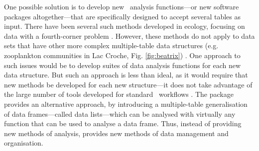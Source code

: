 \documentclass[a4paper]{report}
\numberwithin{exercise}{section}
\begin{document}
\begin{article}
One possible solution is to develop new \R\ analysis functions---or new software packages altogether---that are specifically designed to accept several tables as input.  There have been several such methods developed in ecology, focusing on data with a fourth-corner problem \citep{DoledecEtAl1996,LegendreEtAl1997,DrayAndLegendre2008,PillarEtAl2010,LeiboldEtAl2010,IvesAndHelmus2011}.  However, these methods do not apply to data sets that have other more complex multiple-table data structures (e.g. zooplankton communities in Lac Croche, Fig. \ref{fig:beatrix}) \citep{CantinEtAl2011}.  One approach to such issues would be to develop suites of data analysis functions for each new data structure.  But such an approach is less than ideal, as it would require that new methods be developed for each new structure---it does not take advantage of the large number of tools developed for standard \R\ workflows \citep{ChambersAndHastie1992}.  The  package provides an alternative approach, by introducing a multiple-table generalisation of data frames---called data lists---which can be analysed with virtually any function that can be used to analyse a data frame.  Thus, instead of providing new methods of analysis,  provides new methods of data management and organisation.


\end{article}
\end{document}
